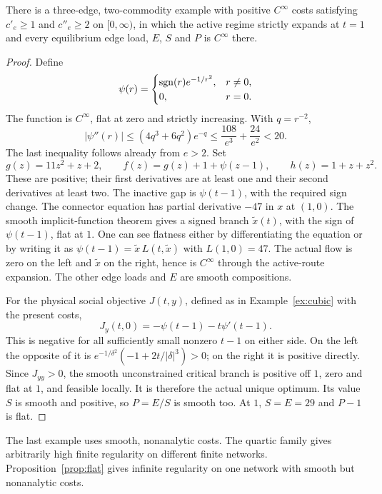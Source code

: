 \begin{proposition}\label{prop:flat}
There is a three-edge, two-commodity example with positive $C^\infty$ costs satisfying $c'_e\ge1$ and $c''_e\ge2$ on $[0,\infty)$, in which the active regime strictly expands at $t=1$ and every equilibrium edge load, $E$, $S$ and $P$ is $C^\infty$ there.
\end{proposition}
\begin{proof}
Define
\begin{equation}
 \psi(r)=\begin{cases}\operatorname{sgn}(r)e^{-1/r^2},&r\ne0,\\0,&r=0.\end{cases}
\end{equation}
The function is $C^\infty$, flat at zero and strictly increasing. With $q=r^{-2}$,
\begin{equation}
 |\psi''(r)|\le(4q^3+6q^2)e^{-q}
 \le\frac{108}{e^3}+\frac{24}{e^2}<20.
\end{equation}
The last inequality follows already from $e>2$. Set
\begin{equation}\label{eq:flatcosts}
 g(z)=11z^2+z+2,\qquad
 f(z)=g(z)+1+\psi(z-1),\qquad
 h(z)=1+z+z^2.
\end{equation}
These are positive; their first derivatives are at least one and their second derivatives at least two. The inactive gap is $\psi(t-1)$, with the required sign change. The connector equation has partial derivative $-47$ in $x$ at $(1,0)$. The smooth implicit-function theorem gives a signed branch $\widetilde x(t)$, with the sign of $\psi(t-1)$, flat at $1$. One can see flatness either by differentiating the equation or by writing it as $\psi(t-1)=\widetilde x\,L(t,\widetilde x)$ with $L(1,0)=47$. The actual flow is zero on the left and $\widetilde x$ on the right, hence is $C^\infty$ through the active-route expansion. The other edge loads and $E$ are smooth compositions.

For the physical social objective $J(t,y)$, defined as in Example~\ref{ex:cubic} with the present costs,
\begin{equation}
 J_y(t,0)=-\psi(t-1)-t\psi'(t-1).
\end{equation}
This is negative for all sufficiently small nonzero $t-1$ on either side. On the left the opposite of it is $e^{-1/\delta^2}(-1+2t/|\delta|^3)>0$; on the right it is positive directly. Since $J_{yy}>0$, the smooth unconstrained critical branch is positive off $1$, zero and flat at $1$, and feasible locally. It is therefore the actual unique optimum. Its value $S$ is smooth and positive, so $P=E/S$ is smooth too. At $1$, $S=E=29$ and $P-1$ is flat.
\end{proof}

The last example uses smooth, nonanalytic costs. The quartic family gives arbitrarily high finite regularity on different finite networks. Proposition~\ref{prop:flat} gives infinite regularity on one network with smooth but nonanalytic costs.

